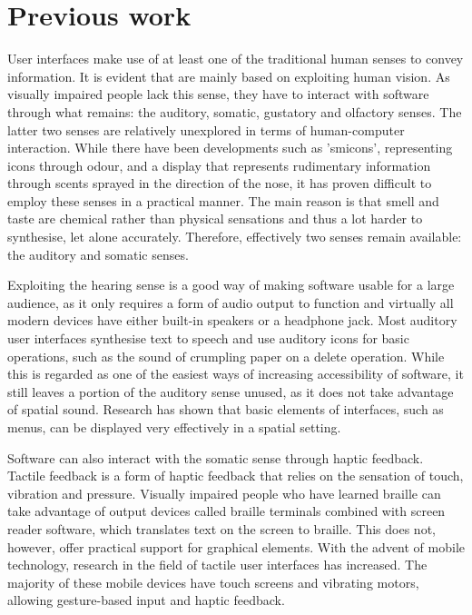 \section{Previous work}
\label{section:previouswork}
User interfaces make use of at least one of the traditional human senses to convey information. It is evident that  are mainly based on exploiting human vision. As visually impaired people lack this sense, they have to interact with software through what remains: the auditory, somatic, gustatory and olfactory senses. The latter two senses are relatively unexplored in terms of human-computer interaction. While there have been developments such as 'smicons', representing icons through odour\cite{kaye2001symbolic}, and a display that represents rudimentary information through scents sprayed in the direction of the nose\cite{yanagida2004projection}, it has proven difficult to employ these senses in a practical manner. The main reason is that smell and taste are chemical rather than physical sensations and thus a lot harder to synthesise, let alone accurately\cite{kortum2008hci}. Therefore, effectively two senses remain available: the auditory and somatic senses.

Exploiting the hearing sense is a good way of making software usable for a large audience, as it only requires a form of audio output to function and virtually all modern devices have either built-in speakers or a headphone jack. Most auditory user interfaces synthesise text to speech and use auditory icons for basic operations, such as the sound of crumpling paper on a delete operation\cite{mynatt1995transforming}. While this is regarded as one of the easiest ways of increasing accessibility of software, it still leaves a portion of the auditory sense unused, as it does not take advantage of spatial sound. Research has shown that basic elements of interfaces, such as menus, can be displayed very effectively in a spatial setting\cite{frauenberger2004spatial}.

Software can also interact with the somatic sense through haptic feedback. Tactile feedback is a form of haptic feedback that relies on the sensation of touch, vibration and pressure. Visually impaired people who have learned braille can take advantage of output devices called braille terminals combined with screen reader software, which translates text on the screen to braille. This does not, however, offer practical support for graphical elements. With the advent of mobile technology, research in the field of tactile user interfaces has increased. The majority of these mobile devices have touch screens and vibrating motors, allowing gesture-based input and haptic feedback\cite{kane2008slide, yatani2009semfeel}.

